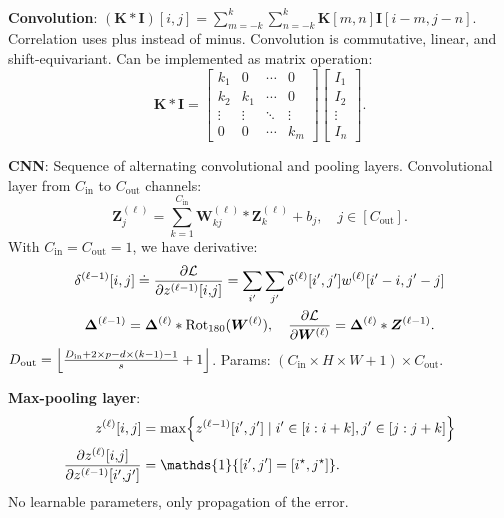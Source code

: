 \documentclass{article}
\newcommand{\lft}{\mathopen{}\mathclose\bgroup\left}
\newcommand{\rgt}{\aftergroup\egroup\right}
\newcommand{\mat}[1]{\bm{#1}}
\newenvironment{topic}[1]
{\textbf{\sffamily \colorbox{black}{\rlap{\textbf{\textcolor{white}{#1}}}\hspace{\linewidth}\hspace{-2\fboxsep}}} \\ \vspace{0.2cm}}
{}
\begin{document}
\begin{multicols*}{2}
\begin{topic}{Convolutional neural networks}
        \textbf{Convolution}: $(\mat{K} * \mat{I})[i,j] = \sum_{m=-k}^{k} \sum_{n=-k}^{k} \mat{K}[m,n] \mat{I}[i-m, j-n]$.
        Correlation uses plus instead of minus. Convolution is commutative, linear, and shift-equivariant.
        Can be implemented as matrix operation: \[
            \mat{K} * \mat{I} = \begin{bmatrix}
                k_1    & 0      & \cdots & 0      \\
                k_2    & k_1    & \cdots & 0      \\
                \vdots & \vdots & \ddots & \vdots \\
                0      & 0      & \cdots & k_m
            \end{bmatrix}
            \begin{bmatrix}
                I_1 \\ I_2 \\ \vdots \\ I_n
            \end{bmatrix}.
        \]

        \textbf{CNN}: Sequence of alternating convolutional and pooling layers. Convolutional layer from $C_{\mathrm{in}}$ to $C_{\mathrm{out}}$ channels: \[
            \mat{Z}_j^{(\ell)} = \sum_{k=1}^{C_{\mathrm{in}}} \mat{W}_{kj}^{(\ell)} * \mat{Z}_k^{(\ell)} + b_j, \quad j \in [C_{\mathrm{out}}].
        \]
        With $C_{\mathrm{in}} = C_{\mathrm{out}} = 1$, we have derivative:
        \begin{gather*}
            \delta^{(\ell-1)}[i,j] \doteq \pdv{\mathcal{L}}{z^{(\ell-1)}[i{,}j]} = \sum_{i'} \sum_{j'} \delta^{(\ell)}[i',j'] w^{(\ell)}[i'-i,j'-j] \\
            \mat{\Delta}^{(\ell-1)} = \mat{\Delta}^{(\ell)} * \mathrm{Rot}_{180}(\mat{W}^{(\ell)}), \quad \pdv{\mathcal{L}}{\mat{W}^{(\ell)}} = \mat{\Delta}^{(\ell)} * \mat{Z}^{(\ell - 1)}.
        \end{gather*}
        $D_{\mathrm{out}} = \lft\lfloor \frac{D_{\mathrm{in}} + 2 \times p - d \times (k - 1) - 1}{s} + 1 \rgt\rfloor$.
        Params: $(C_{\mathrm{in}} \times H \times W + 1) \times C_{\mathrm{out}}$.

        \textbf{Max-pooling layer}:
        \begin{align*}
            z^{(\ell)}[i,j]                                & = \max \lft\{ z^{(\ell-1)}[i',j'] \mid i' \in [i : i + k], j' \in [j : j+k] \rgt\} \\
            \pdv{z^{(\ell)}[i{,}j]}{z^{(\ell-1)}[i'{,}j']} & = \mathds{1}\{ [i',j'] = [i^\star,j^\star] \}.
        \end{align*}
        No learnable parameters, only propagation of the error.


\end{topic}
\end{multicols*}
\end{document}
